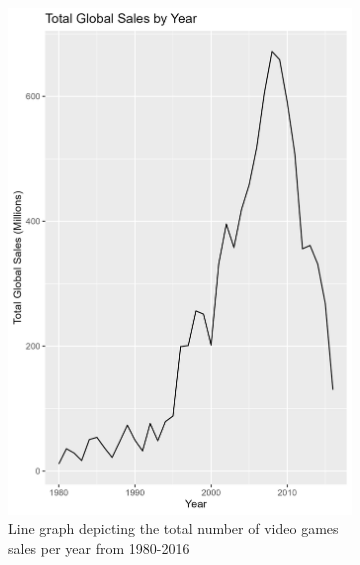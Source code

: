 \documentclass[12pt,english]{article}
\begin{document}
\begin{figure}[ht]
\centering
\begin{subfigure}{0.49\linewidth}
    \centering
    \includegraphics[width=\linewidth]{Figures/total_sales_year.png}
    \caption{Line graph depicting the total number of video games sales per year from 1980-2016}
    \label{fig:fig1}
\end{subfigure}
\begin{subfigure}{0.49\linewidth}
    \centering

\end{subfigure}
\end{figure}
\end{document}
